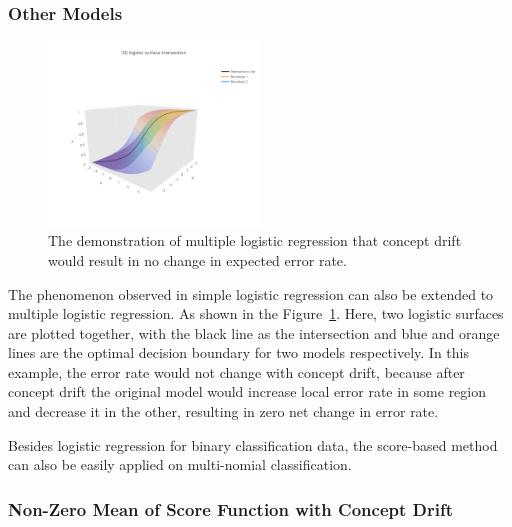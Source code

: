 \documentclass[twoside,11pt]{article}
\begin{document}
\subsubsection{Other Models}
\begin{figure}[!htbp]
\centering
 \includegraphics[width = 0.5\textwidth]{../figures/v14/demons_fig/3D_logistic_surface_intersection.png}
  \caption{The demonstration of multiple logistic regression that concept drift would result in no change in expected error rate.}
  \label{fig:logi_3d}
\end{figure}
The phenomenon observed in simple logistic regression can also be extended to multiple logistic regression. As shown in the Figure~\ref{fig:logi_3d}. Here, two logistic surfaces are plotted together, with the black line as the intersection and blue and orange lines are the optimal decision boundary for two models respectively. In this example, the error rate would not change with concept drift, because after concept drift the original model would increase local error rate in some region and decrease it in the other, resulting in zero net change in error rate. 

Besides logistic regression for binary classification data, the score-based method can also be easily applied on multi-nomial classification. 

\subsubsection{Non-Zero Mean of Score Function with Concept Drift}
\label{ss:non_zero_mean_score}


\end{document}
